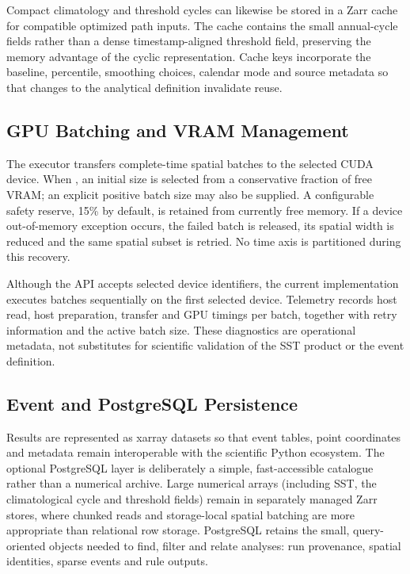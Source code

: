 Compact climatology and threshold cycles can likewise be stored in a Zarr cache for compatible optimized path inputs. The cache contains the small annual-cycle fields rather than a dense timestamp-aligned threshold field, preserving the memory advantage of the cyclic representation. Cache keys incorporate the baseline, percentile, smoothing choices, calendar mode and source metadata so that changes to the analytical definition invalidate reuse.

\subsection{GPU Batching and VRAM Management}

The executor transfers complete-time spatial batches to the selected CUDA device. When , an initial size is selected from a conservative fraction of free VRAM; an explicit positive batch size may also be supplied. A configurable safety reserve, 15\% by default, is retained from currently free memory. If a device out-of-memory exception occurs, the failed batch is released, its spatial width is reduced and the same spatial subset is retried. No time axis is partitioned during this recovery.

Although the API accepts selected device identifiers, the current implementation executes batches sequentially on the first selected device. Telemetry records host read, host preparation, transfer and GPU timings per batch, together with retry information and the active batch size. These diagnostics are operational metadata, not substitutes for scientific validation of the SST product or the event definition.

\subsection{Event and PostgreSQL Persistence}

Results are represented as xarray datasets so that event tables, point coordinates and metadata remain interoperable with the scientific Python ecosystem. The optional PostgreSQL layer is deliberately a simple, fast-accessible catalogue rather than a numerical archive. Large numerical arrays (including SST, the climatological cycle and threshold fields) remain in separately managed Zarr stores, where chunked reads and storage-local spatial batching are more appropriate than relational row storage. PostgreSQL retains the small, query-oriented objects needed to find, filter and relate analyses: run provenance, spatial identities, sparse events and rule outputs.

